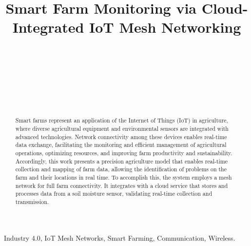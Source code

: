 \documentclass[journal]{IEEEtran}
\begin{document}
\title{Smart Farm Monitoring via Cloud-Integrated IoT Mesh Networking}

\author{
\\
\and
{}
\\
\and
{}
\\
\and
{}
\\
\and
{}
}

\maketitle

\begin{abstract}
Smart farms represent an application of the Internet of Things (IoT) in agriculture, where diverse agricultural equipment and environmental sensors are integrated with advanced technologies. Network connectivity among these devices enables real-time data exchange, facilitating the monitoring and efficient management of agricultural operations, optimizing resources, and improving farm productivity and sustainability. Accordingly, this work presents a precision agriculture model that enables real-time collection and mapping of farm data, allowing the identification of problems on the farm and their locations in real time. To accomplish this, the system employs a mesh network for full farm connectivity. It integrates with a cloud service that stores and processes data from a soil moisture sensor, validating real-time collection and transmission.
\end{abstract}

\begin{IEEEkeywords}
Industry 4.0, IoT Mesh Networks, Smart Farming, Communication, Wireless.
\end{IEEEkeywords}
\end{document}
